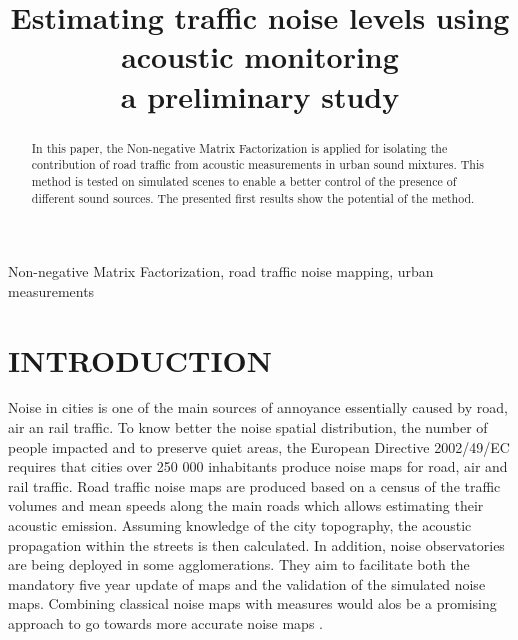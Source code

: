 \documentclass{article}
\title{Estimating traffic noise levels using acoustic monitoring \\ a preliminary study}
\begin{document}
\ninept
\maketitle

\begin{sloppy}

\begin{abstract}
In this paper, the Non-negative Matrix Factorization is applied for isolating the contribution of road traffic from acoustic measurements in urban sound mixtures. This method is tested on simulated scenes to enable a better control of the presence of different sound sources. The presented first results show the potential of the method.
\end{abstract}

\begin{keywords}
Non-negative Matrix Factorization, road traffic noise mapping, urban measurements
\end{keywords}

\section{INTRODUCTION}
\label{sec:motivations}

Noise in cities is one of the main sources of annoyance essentially caused by road, air an rail traffic. To know better the noise spatial distribution, the number of people impacted and to preserve quiet areas, the European Directive 2002/49/EC \cite{directive} requires that cities over 250 000 inhabitants produce noise maps for road, air and rail traffic. Road traffic noise maps are produced based on a census of the traffic volumes and mean speeds along the main roads which allows estimating their acoustic emission. Assuming knowledge of the city topography, the acoustic propagation within the streets is then calculated. In addition, noise observatories are being deployed in some agglomerations. They aim to facilitate both the mandatory five year update of maps and the validation of the simulated noise maps. Combining classical noise maps with measures would alos be a promising approach to go towards more accurate noise maps \cite{Can} \cite{deCoensel}.



\end{sloppy}
\end{document}

